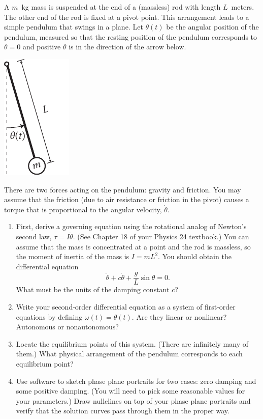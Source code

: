 \documentclass[12pt,letterpaper]{hmcpset}
\newcommand{\f}[2]{\frac{#1}{#2}}
\begin{document}
\begin{problem}[4]
    A $m$~kg mass is suspended at the end of a (massless) rod with
    length $L$~meters. The other end of the rod is fixed at a pivot
    point. This arrangement leads to a simple pendulum that
    swings in a plane. Let $\theta(t)$ be the angular position of the
    pendulum, measured so that the resting position of the pendulum
    corresponds to $\theta=0$ and positive $\theta$ is in the
    direction of the arrow below.
    \begin{center}
        \includegraphics{img/june_1_4}
    \end{center}
    There are two forces acting on the pendulum: gravity and
    friction. You may assume that the friction (due to air resistance
    or friction in the pivot) causes a torque that is proportional to
    the angular velocity, $\dot{\theta}$.
    \begin{enumerate}
    \item First, derive a governing equation using the rotational
        analog of Newton's second law, $\tau=I\ddot{\theta}$.  (See
        Chapter 18 of your Physics 24 textbook.) You can assume that the
        mass is concentrated at a point and the rod is massless, so the
        moment of inertia of the mass is $I=mL^2$.  You should obtain
        the differential equation
        \[
            \ddot{\theta}+c\dot{\theta}+\f{g}{L}\sin\theta=0.
        \]
        What must be the units of the damping constant $c$?
    \item Write your second-order differential equation as a system of
        first-order equations by defining
        $\omega(t)=\dot{\theta}(t)$. Are they linear or nonlinear?
        Autonomous or nonautonomous?
    \item Locate the equilibrium points of this system. (There are
        infinitely many of them.)  What physical arrangement of the
        pendulum corresponds to each equilibrium point?
    \item Use software to sketch phase plane portraits for two cases:
        zero damping and some positive damping.  (You will need to pick
        some reasonable values for your parameters.)  Draw nullclines on
        top of your phase plane portraits and verify that the solution
        curves pass through them in the proper way.
\end{enumerate}
\end{problem}
\newpage
\begin{solution}
    \null\vfill
\end{solution}
\newpage
\end{document}
